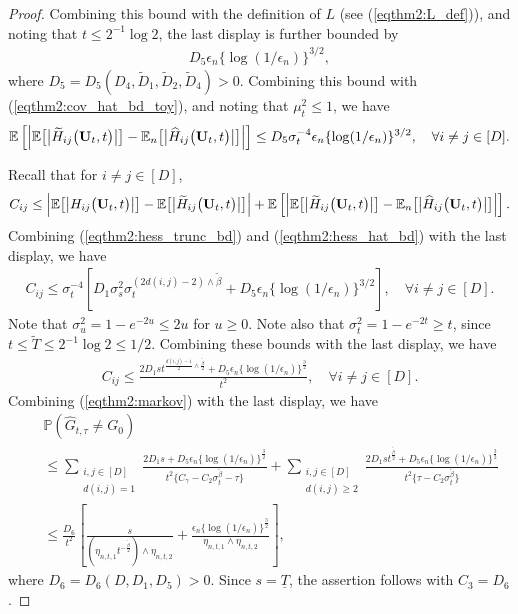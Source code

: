 \documentclass[11pt,a4paper,final]{article}
\numberwithin{equation}{section}
\theoremstyle{remark}
\newcommand{\bU}{{\bf U}}
\newcommand{\bbE}{{\mathbb E}}
\newcommand{\bbP}{{\mathbb P}}
\newcommand{\be}{\begin{equation}}
\newcommand{\ee}{\end{equation}}
\newcommand{\bean}{\setlength\arraycolsep{1pt}\begin{eqnarray*}}
\newcommand{\eean}{\end{eqnarray*}}
\begin{document}
\begin{proof}
Combining this bound with the definition of $L$ (see (\ref{eqthm2:L_def})), and noting that $t \leq  2^{-1} \log 2$, the last display is further bounded by
\bean
D_{5} \epsilon_n  \{ \log (1/\epsilon_n) \}^{3/2},
\eean
where $D_{5} = D_{5} ( D_{4}, \widetilde D_{1}, \widetilde D_{2}, \widetilde D_{4} ) > 0$.
Combining this bound with (\ref{eqthm2:cov_hat_bd_toy}), and noting that $\mu_{t}^2 \leq 1$, we have 
\be
\bbE \left[  \left\vert \bbE \big[  \big\vert \widetilde H_{ij} \big( \bU_{t}, t \big)  \big\vert \big] - \bbE_{n} \big[  \big\vert \widehat H_{ij} \big( \bU_{t}, t \big)  \big\vert \big] \right\vert  \right]
\leq  D_{5} \sigma_{t}^{-4} \epsilon_n  \{ \log (1/\epsilon_n) \}^{3/2}, \quad \forall i \neq j \in [D].
\label{eqthm2:hess_hat_bd}
\ee

Recall that for $i \neq j \in [D]$,
\bean
C_{ij}
\leq  \left\vert  \bbE \big[  \big\vert H_{ij} \big( \bU_{t}, t \big)  \big\vert  \big] -  \bbE \big[   \big\vert \widetilde H_{ij} \big( \bU_{t}, t \big)  \big\vert \big]  \right\vert
+
 \bbE \left[  \left\vert \bbE \big[  \big\vert \widetilde H_{ij} \big( \bU_{t}, t \big)  \big\vert \big] - \bbE_{n} \big[  \big\vert \widehat H_{ij} \big( \bU_{t}, t \big)  \big\vert \big] \right\vert  \right].
\eean
Combining (\ref{eqthm2:hess_trunc_bd}) and (\ref{eqthm2:hess_hat_bd}) with the last display, we have
\bean
C_{ij}
\leq
 \sigma_{t}^{-4} \left[ D_{1} \sigma_{s}^2 \sigma_{t}^{(2 d(i,j) -2) \wedge {\tilde \beta} }  + D_{5} \epsilon_n  \{ \log (1/\epsilon_n) \}^{3/2} \right],
 \quad \forall i \neq j \in [D].
\eean
Note that $\sigma_{u}^2 = 1 - e^{-2u} \leq 2u$ for $u \geq 0$.
Note also that $\sigma_{t}^2 = 1- e^{-2t} \geq t$, since $t \leq {\widetilde T} \leq 2^{-1} \log 2 \leq 1/2$.
Combining these bounds with the last display, we have
\bean
C_{ij} \leq  \frac{ 2 D_{1} s t^{\frac{d(i,j) - 1 }{2} \wedge \frac{{\tilde \beta}}{2}} +  D_{5} \epsilon_n  \{ \log (1/\epsilon_n) \}^{\frac{3}{2}}  }{t^{2}} , 
 \quad \forall i \neq j \in [D].
 \eean
Combining  (\ref{eqthm2:markov}) with the last display, we have
\bean
&& \bbP \left( \widehat G_{t,\tau} \neq G_{0}  \right)
\\
&& \leq
\sum_{ \substack {i,j \in [D]  \\ d(i,j) = 1 } } \frac{ 2 D_{1} s +  D_{5} \epsilon_n  \{ \log (1/\epsilon_n) \}^{\frac{3}{2}}  }{ t^2 \{  C_{\gamma} - C_{2} \sigma_{t}^{{\tilde \beta}} - \tau  \} }
 + \sum_{  \substack {i,j \in [D]  \\ d(i,j) \geq 2 } } \frac{ 2 D_{1} s t^{\frac{{\tilde \beta}}{2}} +  D_{5} \epsilon_n  \{ \log (1/\epsilon_n) \}^{\frac{3}{2}}  }{ t^2 \{ \tau  - C_{2} \sigma_{t}^{{\tilde \beta}} \} }
\\
&& \leq \frac{D_{6}}{t^2} \left[
\frac{s}{ ( \eta_{n,t,1} t^{-\frac{{\tilde \beta}}{2}} ) \wedge \eta_{n,t,2} }
+
\frac{ \epsilon_n  \{ \log (1/\epsilon_n) \}^{\frac{3}{2}} }{\eta_{n,t,1} \wedge \eta_{n,t,2}}
\right],
\eean
where $D_{6} = D_{6} ( D, D_{1}, D_{5} ) > 0$.
Since $s = \underline{T}$, the assertion follows with $C_{3} = D_{6}$.

\end{proof}
\end{document}
